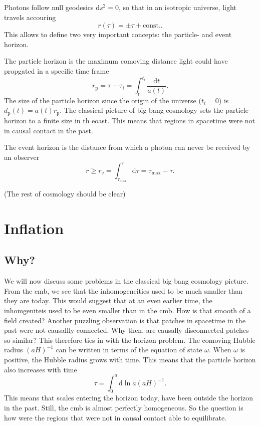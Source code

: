 \documentclass[12pt]{article}
\begin{document}
Photons follow null geodesics $\mathrm{d}s^2 = 0$, so that in an isotropic universe, light travels accouring
\begin{equation}
    r(\tau) = \pm \tau + \mathrm{ const.}.
\end{equation}
This allows to define two very important concepts: the particle- and event horizon.

The particle horizon is the maximum comoving distance light could have propgated in a specific time frame
\begin{equation}
    r_{\mathrm{p}} = \tau - \tau_i = \int_{t}^{t_i} \frac{\mathrm{d}t}{a(t)}.
\end{equation}
The size of the particle horizon since the origin of the universe ($t_i = 0$) is $d_\mathrm{p}(t) = a(t) r_{\mathrm{p}}$. The classical picture of big bang cosmology sets the particle horizon to a finite size in th eoast. This means that regions in spacetime were not in causal contact in the past. 

The event horizon is the distance from which a photon can never be received by an observer
\begin{equation}
    r \geq r_\mathrm{e} = \int_{\tau_\mathrm{max}}^{\tau} \mathrm{d}\tau = \tau_\mathrm{max} - \tau.
\end{equation}

(The rest of cosmology should be clear)


\section{Inflation}
\subsection{Why?}
We will    now discuss some problems in the classical big bang cosmology picture. From the cmb, we see that the inhomogeneities used to be much smaller than they are today. This would suggest that at an even earlier time, the inhomgeniteis used to be even smaller than in the cmb. How is that smooth of a field created? Another puzzling observation is that patches in spacetime in the past were not causallly connected. Why then, are causally disconnected patches so similar? This therefore ties in with the horizon problem. The comoving Hubble radius $(aH)^{-1}$ can be written in terms of the equation of state $\omega$. When $\omega$ is positive, the Hubble radius grows with time. This means that the particle horizon also increases with time 
\begin{equation}
    \tau = \int_{0}^{a}\mathrm{d}\ln a (aH)^{-1}.
\end{equation}
This means that scales entering the horizon today, have been outside the horizon in the past. Still, the cmb is almost perfectly homogeneous. So the question is how were the regions that were not in causal contact able to equilibrate.
\end{document}
